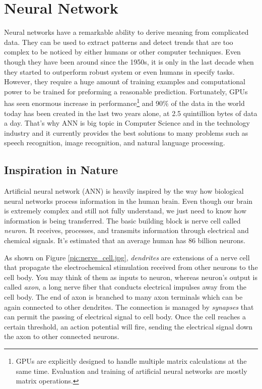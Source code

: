 \chapter{Neural Network}


Neural networks have a remarkable ability to derive meaning from complicated data. They can be used to extract patterns and detect trends that are too complex to be noticed by either humans or other computer techniques\cite{introduction_ann}.
Even though they have been around since the 1950s, it is only in the last decade when they started to outperform robust system or even humans in specify tasks.
However, they require a huge amount of training examples and computational power to be trained for preforming a reasonable prediction.
Fortunately, GPUs has seen enormous increase in performance\footnote{\label{note1}GPUs are explicitly designed to handle multiple matrix calculations at the same time. Evaluation and training of artificial neural networks are mostly matrix operations.} and
90\% of the data in the world today has been created in the last two years alone, at 2.5 quintillion bytes of data a day\cite{ibm_data}.
That's why ANN is big topic in Computer Science and in the technology industry and it currently provides the best solutions to many problems such as speech recognition, image recognition, and natural language processing.

\section{Inspiration in Nature}

Artificial neural network (ANN) is heavily inspired by the way how biological neural networks process information in the human brain.
Even though our brain is extremely complex and still not fully understand, we just need to know how information is being transferred.
The basic building block is nerve cell called \textit{neuron}. It receives, processes, and transmits information through electrical and chemical signals\cite{neuron}.
It's estimated that an average human has 86 billion neurons\cite{number_of_neurons}.


As shown on Figure \ref{pic:nerve_cell.jpg}, \textit{dendrites} are extensions of a nerve cell that propagate the electrochemical stimulation received from other neurons to the cell body.
You may think of them as inputs to neuron, whereas neuron's output is called \textit{axon}, a long nerve fiber that conducts electrical impulses away from the cell body.
The end of axon is branched to many axon terminals which can be again connected to other dendrites.
The connection is managed by \textit{synapses} that can permit the passing of electrical signal to cell body.
Once the cell reaches a certain threshold, an action potential will fire, sending the electrical signal down the axon to other connected neurons.

